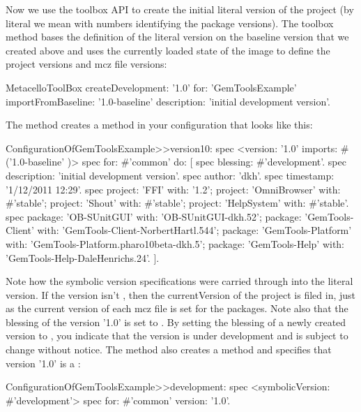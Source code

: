 \documentclass[a4paper,10pt,twoside]{book}
\begin{document}
\begin{code}{}
\begin{code}{}
Now we use the toolbox API to create the initial literal version of the project (by literal we mean with numbers identifying the package versions). The toolbox method  bases the definition of the literal version on the baseline version that we created above and uses the currently loaded state of the image to define the project versions and mcz file versions:

\begin{code}{}
  MetacelloToolBox
     createDevelopment: '1.0'
     for: 'GemToolsExample'
     importFromBaseline: '1.0-baseline'
     description: 'initial development version'.
\end{code}

The  method creates a  method in your configuration that looks like this:

\begin{code}{}
ConfigurationOfGemToolsExample>>version10: spec
  <version: '1.0' imports: #('1.0-baseline' )>
  spec for: #'common' do: [
     spec blessing: #'development'.
     spec description: 'initial development version'.
     spec author: 'dkh'.
     spec timestamp: '1/12/2011 12:29'.
     spec 
        project: 'FFI' with: '1.2';
        project: 'OmniBrowser' with: #'stable';
        project: 'Shout' with: #'stable';
        project: 'HelpSystem' with: #'stable'.
     spec
        package: 'OB-SUnitGUI' with: 'OB-SUnitGUI-dkh.52';
        package: 'GemTools-Client' with: 'GemTools-Client-NorbertHartl.544';
        package: 'GemTools-Platform' with: 'GemTools-Platform.pharo10beta-dkh.5';
        package: 'GemTools-Help' with: 'GemTools-Help-DaleHenrichs.24'. ].
\end{code}

Note how the  symbolic version specifications were carried through into the literal version. If the version isn't , then the currentVersion of the project is filed in, just as the current version of each mcz file is set for the packages. Note also that the blessing of the version '1.0' is set to . By setting the blessing of a newly created version to , you indicate that the version is under development and is subject to change without notice. The  method also creates a  method and specifies that version '1.0' is a :

\begin{code}{}
ConfigurationOfGemToolsExample>>development: spec
  <symbolicVersion: #'development'>
  spec for: #'common' version: '1.0'.
\end{code}



\end{code}
\end{code}
\end{document}
